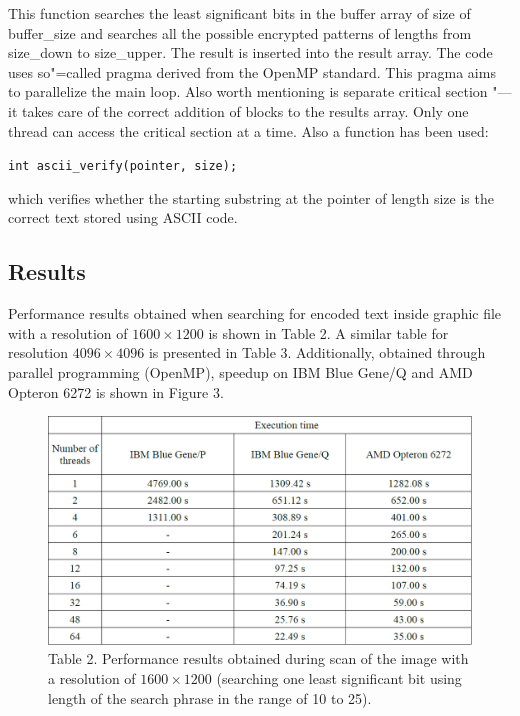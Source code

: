 \documentclass[10pt, a5paper]{article}
\begin{document}
This function searches the least significant bits in the buffer array of size of buffer\_size and searches all the possible encrypted patterns of lengths from size\_down to size\_upper. The result is inserted into the result array. The code uses so"=called pragma derived from the OpenMP standard. This pragma aims to parallelize the main loop. Also worth mentioning is separate critical section "--- it takes care of the correct addition of blocks to the results array. Only one thread can access the critical section at a time. Also a function has been used:

\verb!int ascii_verify(pointer, size);!

which verifies whether the starting substring at the pointer of length size is the correct text stored using ASCII code.

\subsection*{Results}

Performance results obtained when searching for encoded text inside graphic file with a resolution of $1600\times1200$ is shown in Table 2. A similar table for resolution $4096\times4096$ is presented in Table 3. Additionally, obtained through parallel programming (OpenMP), speedup on IBM Blue Gene/Q and AMD Opteron 6272 is shown in Figure 3.


\begin{figure}[h!]
  \centering
  \includegraphics[width=\textwidth]{103_2014_w_Kwiatkowska_time2.png}
  Table 2. Performance results obtained during scan of the image with a resolution of $1600\times1200$ (searching one least significant bit using length of the search phrase in the range of 10 to 25).
\end{figure}
\end{document}
